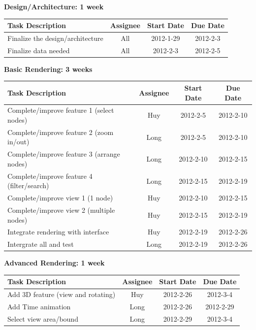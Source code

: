 \documentclass[12pt, letterpaper]{article}
\begin{document}
  \begin{center}
		{\bf Design/Architecture: 1 week}
    \begin{tabular}{|p{8.3cm} || c | c | c | }
      \hline
      Task Description & Assignee & Start Date & Due Date \\
      \hline
	    Finalize the design/architecture & All & 2012-1-29 & 2012-2-3 \\
	    Finalize data needed  & All & 2012-2-3 & 2012-2-5 \\
      \hline
    \end{tabular}
  \end{center}

  \begin{center}
		{\bf Basic Rendering: 3 weeks}
    \begin{tabular}{| p{8.3cm} || c | c | c | }
      \hline
      Task Description & Assignee & Start Date & Due Date \\
      \hline
 	    Complete/improve feature 1 (select nodes) & Huy & 2012-2-5 & 2012-2-10 \\
	    Complete/improve feature 2 (zoom in/out)  & Long & 2012-2-5 & 2012-2-10 \\
	    Complete/improve feature 3 (arrange nodes)  & Long & 2012-2-10 & 2012-2-15 \\
	    Complete/improve feature 4 (filter/search)  & Long & 2012-2-15 & 2012-2-19 \\
	    Complete/improve view 1 (1 node)  & Huy& 2012-2-10 & 2012-2-15 \\
            Complete/improve view 2 (multiple nodes)  & Huy & 2012-2-15 & 2012-2-19 \\
            Integrate rendering with interface  & Huy & 2012-2-19 & 2012-2-26 \\  
            Intergrate all and test  & Long & 2012-2-19 & 2012-2-26 \\
      \hline
    \end{tabular}
  \end{center}

  \begin{center}
		{\bf Advanced Rendering: 1 week}
    \begin{tabular}{|p{8.3cm} || c | c | c | }
      \hline
      Task Description & Assignee & Start Date & Due Date \\
      \hline
	    Add 3D feature (view and rotating) & Huy & 2012-2-26 & 2012-3-4 \\
	    Add Time animation & Long & 2012-2-26 & 2012-2-29 \\
		Select view area/bound & Long & 2012-2-29 & 2012-3-4 \\
      \hline
    \end{tabular}
  \end{center}
\end{document}
